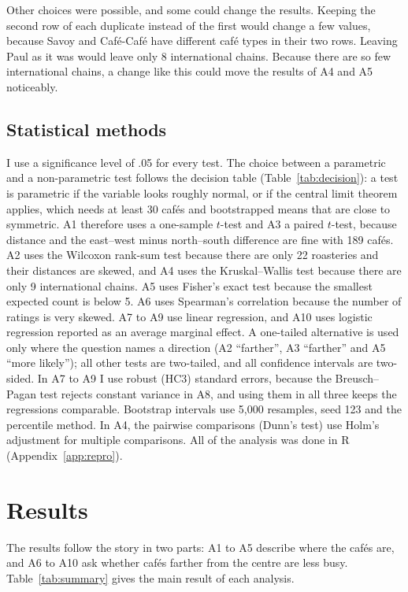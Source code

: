 \documentclass[11pt,a4paper]{article}
\begin{document}
Other choices were possible, and some could change the results. Keeping the second row of each duplicate instead of the first would change a few values, because Savoy and Caf\'e-Caf\'e have different caf\'e types in their two rows. Leaving Paul as it was would leave only 8 international chains. Because there are so few international chains, a change like this could move the results of A4 and A5 noticeably.

\subsection{Statistical methods}
I use a significance level of .05 for every test. The choice between a parametric and a non-parametric test follows the decision table (Table~\ref{tab:decision}): a test is parametric if the variable looks roughly normal, or if the central limit theorem applies, which needs at least 30 caf\'es and bootstrapped means that are close to symmetric. A1 therefore uses a one-sample $t$-test and A3 a paired $t$-test, because distance and the east--west minus north--south difference are fine with 189 caf\'es. A2 uses the Wilcoxon rank-sum test because there are only 22 roasteries and their distances are skewed, and A4 uses the Kruskal--Wallis test because there are only 9 international chains. A5 uses Fisher's exact test because the smallest expected count is below 5. A6 uses Spearman's correlation because the number of ratings is very skewed. A7 to A9 use linear regression, and A10 uses logistic regression reported as an average marginal effect. A one-tailed alternative is used only where the question names a direction (A2 ``farther'', A3 ``farther'' and A5 ``more likely''); all other tests are two-tailed, and all confidence intervals are two-sided. In A7 to A9 I use robust (HC3) standard errors, because the Breusch--Pagan test rejects constant variance in A8, and using them in all three keeps the regressions comparable. Bootstrap intervals use 5,000 resamples, seed 123 and the percentile method. In A4, the pairwise comparisons (Dunn's test) use Holm's adjustment for multiple comparisons. All of the analysis was done in R (Appendix~\ref{app:repro}).

\section{Results}

The results follow the story in two parts: A1 to A5 describe where the caf\'es are, and A6 to A10 ask whether caf\'es farther from the centre are less busy. Table~\ref{tab:summary} gives the main result of each analysis.
\end{document}
